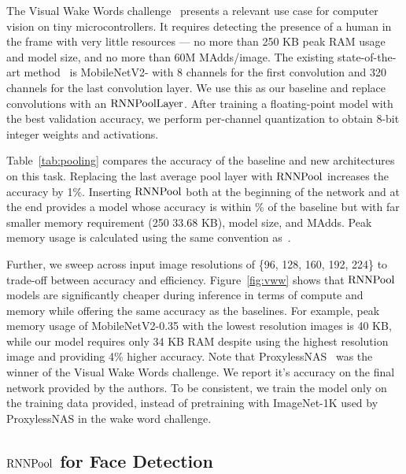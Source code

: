 \documentclass[10pt]{article}
\newcommand{\rpool}{\ensuremath{{\rm RNNPool}}\xspace}
\newcommand{\rpoollayer}{\ensuremath{{\rm RNNPoolLayer}}\xspace}
\newcommand{\alg}{\rpool}
\begin{document}
 The Visual Wake Words challenge~\citep{chowdhery2019visual} presents a
relevant use case for computer vision on tiny microcontrollers. It
requires detecting the presence of a human in the frame with very
little resources --- no more than 250 KB peak RAM usage and model
size, and no more than 60M MAdds/image. The existing state-of-the-art
method~\citep{chowdhery2019visual} is MobileNetV2- with 8
channels for the first convolution and 320 channels for the last
convolution layer.  We use this as our baseline and replace
convolutions with an \rpoollayer. After training a floating-point
model with the best validation accuracy, we perform per-channel
quantization to obtain 8-bit integer weights and activations.

Table~\ref{tab:pooling} compares the accuracy of the baseline and new
architectures on this task. Replacing the last average pool layer
with \rpool increases the accuracy by  1\%.  Inserting \rpool
both at the beginning of the network and at the end provides a model
whose accuracy is within \% of the baseline but with far smaller
memory requirement (250  33.68 KB), model size, and MAdds.  Peak
memory usage is calculated using the same convention
as~\citep{chowdhery2019visual}.

Further, we sweep across input image resolutions of \{96, 128, 160,
192, 224\} to trade-off between accuracy and
efficiency. Figure~\ref{fig:vww} shows that \rpool models are
significantly cheaper during inference in terms of compute and memory
while offering the same accuracy as the baselines. For example, peak
memory usage of MobileNetV2-0.35 with the lowest resolution
images is 40 KB, while our model requires only 34 KB RAM despite
using the highest resolution image and providing 4\% higher
accuracy. Note that ProxylessNAS~\citep{mit-hanvww} was the winner of
the Visual Wake Words challenge. We report it's accuracy on the final
network provided by the authors. To be consistent, we train the model
only on the training data provided, instead of pretraining with
ImageNet-1K used by ProxylessNAS in the wake word challenge.

\subsection{\alg for Face Detection}
\label{sec:fdexpts}
\end{document}

